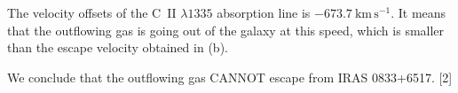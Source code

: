 \begin{description}
  The velocity offsets of the C~II $\lambda 1335$ absorption line is
  $-673.7~\mathrm{km\,s^{-1}}$. It means that the outflowing gas is going out
  of the galaxy at this speed, which is smaller than the escape velocity
  obtained in (b).

  We conclude that the outflowing gas CANNOT escape from
  IRAS 0833+6517. \hfill[2]
\end{description}
